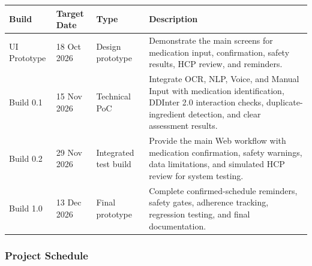 \begin{longtable}{|L{0.16\textwidth}|L{0.17\textwidth}|L{0.17\textwidth}|L{0.38\textwidth}|}
\hline
\textbf{Build} & \textbf{Target Date} &
\textbf{Type} & \textbf{Description}\\ \hline

UI Prototype
& 18 Oct 2026
& Design prototype
& Demonstrate the main screens for medication input,
confirmation, safety results, HCP review, and reminders.
\\ \hline

Build 0.1
& 15 Nov 2026
& Technical PoC
& Integrate OCR, NLP, Voice, and Manual Input with
medication identification, DDInter 2.0 interaction
checks, duplicate-ingredient detection, and
clear assessment results.
\\ \hline

Build 0.2
& 29 Nov 2026
& Integrated test build
& Provide the main Web workflow with medication
confirmation, safety warnings, data limitations,
and simulated HCP review for system testing.
\\ \hline

Build 1.0
& 13 Dec 2026
& Final prototype
& Complete confirmed-schedule reminders, safety
gates, adherence tracking, regression testing,
and final documentation.
\\ \hline

\end{longtable}

\subsubsection{Project Schedule}

